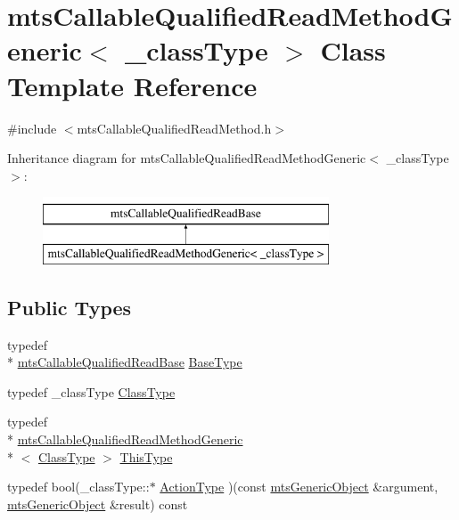 \hypertarget{classmts_callable_qualified_read_method_generic}{\section{mts\-Callable\-Qualified\-Read\-Method\-Generic$<$ \-\_\-class\-Type $>$ Class Template Reference}
\label{classmts_callable_qualified_read_method_generic}
}


{\ttfamily \#include $<$mts\-Callable\-Qualified\-Read\-Method.\-h$>$}

Inheritance diagram for mts\-Callable\-Qualified\-Read\-Method\-Generic$<$ \-\_\-class\-Type $>$\-:\begin{figure}[H]
\begin{center}
\leavevmode
\includegraphics[height=2.000000cm]{d3/d9d/classmts_callable_qualified_read_method_generic}
\end{center}
\end{figure}
\subsection*{Public Types}
\begin{DoxyCompactItemize}
\item 
typedef \\*
\hyperlink{classmts_callable_qualified_read_base}{mts\-Callable\-Qualified\-Read\-Base} \hyperlink{classmts_callable_qualified_read_method_generic_a773d5a3d8a4847835a36aa9ccfb93774}{Base\-Type}
\item 
typedef \-\_\-class\-Type \hyperlink{classmts_callable_qualified_read_method_generic_ada2d394b00a2db849dd5d67b965fd63b}{Class\-Type}
\item 
typedef \\*
\hyperlink{classmts_callable_qualified_read_method_generic}{mts\-Callable\-Qualified\-Read\-Method\-Generic}\\*
$<$ \hyperlink{classmts_callable_qualified_read_method_generic_ada2d394b00a2db849dd5d67b965fd63b}{Class\-Type} $>$ \hyperlink{classmts_callable_qualified_read_method_generic_ae4d162ce942aeab0d486d2aa8f001a39}{This\-Type}
\item 
typedef bool(\-\_\-class\-Type\-::$\ast$ \hyperlink{classmts_callable_qualified_read_method_generic_acf52fbc6f885178cd934f20cfcd96872}{Action\-Type} )(const \hyperlink{classmts_generic_object}{mts\-Generic\-Object} \&argument, \hyperlink{classmts_generic_object}{mts\-Generic\-Object} \&result) const 
\end{DoxyCompactItemize}
